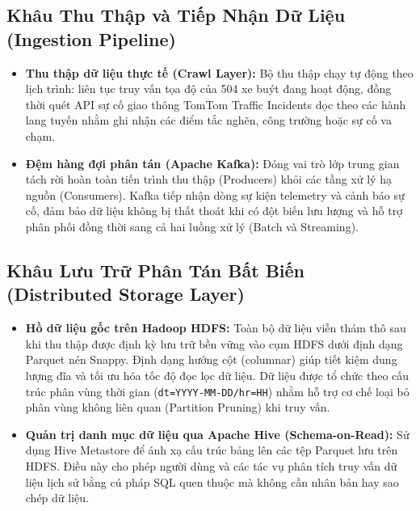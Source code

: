 \documentclass[11pt,a4paper]{article}
\begin{document}
\subsection{Khâu Thu Thập và Tiếp Nhận Dữ Liệu (Ingestion Pipeline)}
\begin{itemize}[leftmargin=*,noitemsep,topsep=1.5pt]
    \item \textbf{Thu thập dữ liệu thực tế (Crawl Layer):} Bộ thu thập chạy tự động theo lịch trình: liên tục truy vấn tọa độ của 504 xe buýt đang hoạt động, đồng thời quét API sự cố giao thông TomTom Traffic Incidents dọc theo các hành lang tuyến nhằm ghi nhận các điểm tắc nghẽn, công trường hoặc sự cố va chạm.
    \item \textbf{Đệm hàng đợi phân tán (Apache Kafka):} Đóng vai trò lớp trung gian tách rời hoàn toàn tiến trình thu thập (Producers) khỏi các tầng xử lý hạ nguồn (Consumers). Kafka tiếp nhận dòng sự kiện telemetry và cảnh báo sự cố, đảm bảo dữ liệu không bị thất thoát khi có đột biến lưu lượng và hỗ trợ phân phối đồng thời sang cả hai luồng xử lý (Batch và Streaming).
\end{itemize}

\newpage
\subsection{Khâu Lưu Trữ Phân Tán Bất Biến (Distributed Storage Layer)}
\begin{itemize}[leftmargin=*,noitemsep,topsep=1.5pt]
    \item \textbf{Hồ dữ liệu gốc trên Hadoop HDFS:} Toàn bộ dữ liệu viễn thám thô sau khi thu thập được định kỳ lưu trữ bền vững vào cụm HDFS dưới định dạng Parquet nén Snappy. Định dạng hướng cột (columnar) giúp tiết kiệm dung lượng đĩa và tối ưu hóa tốc độ đọc lọc dữ liệu. Dữ liệu được tổ chức theo cấu trúc phân vùng thời gian (\texttt{dt=YYYY-MM-DD/hr=HH}) nhằm hỗ trợ cơ chế loại bỏ phân vùng không liên quan (Partition Pruning) khi truy vấn.
    \item \textbf{Quản trị danh mục dữ liệu qua Apache Hive (Schema-on-Read):} Sử dụng Hive Metastore để ánh xạ cấu trúc bảng lên các tệp Parquet lưu trên HDFS. Điều này cho phép người dùng và các tác vụ phân tích truy vấn dữ liệu lịch sử bằng cú pháp SQL quen thuộc mà không cần nhân bản hay sao chép dữ liệu.
\end{itemize}
\end{document}

